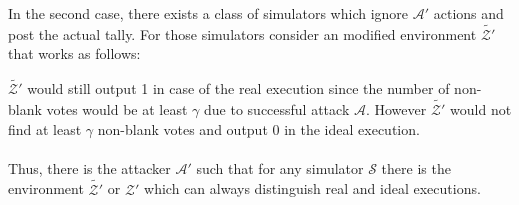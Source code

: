 In the second case, there exists a class of simulators which ignore $\mathcal{A'}$ actions and post the actual tally.  For those simulators consider an modified  environment $\tilde{\mathcal{Z'}}$ that works as follows:\\

$\tilde{\mathcal{Z'}}$ would still output 1 in case of the real execution since the number of non-blank votes would be at least $\gamma$ due to successful attack  $\mathcal{A}$. However  $\tilde{\mathcal{Z'}}$ would not find at least $\gamma$ non-blank votes and output 0 in the ideal execution. \\\\
Thus, there is the attacker $\mathcal{A'}$ such that for any simulator $\mathcal{S}$ there is the environment $\tilde{\mathcal{Z'}}$ or $\mathcal{Z'}$ which can always distinguish real and ideal executions. 